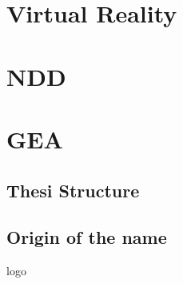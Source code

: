 \emph{}

\section{Virtual Reality}
\section{NDD}
\section{GEA}
\subsection{Thesi Structure}
\subsection{Origin of the name}
logo


